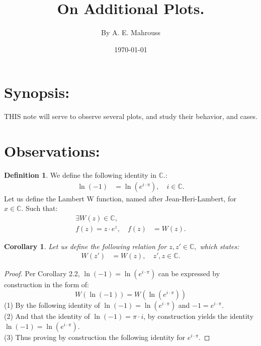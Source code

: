 \documentclass[10pt]{article}
\title{%
	\vspace{-1.5em}%
	\large\textbf{On Additional Plots.}%
}
\author{By A. E. Mahrouss}
\date{\today}
\theoremstyle{plain}
\newtheorem{corollary}[theorem]{Corollary}
\theoremstyle{definition}
\newtheorem{definition}[theorem]{Definition}
\theoremstyle{remark}
\begin{document}

\maketitle
\tableofcontents
\newpage

\section{Synopsis:}

\lettrine[lines=1, lhang=0.1, loversize=0.2]{T}HIS note will serve to observe several plots, and study their behavior, and cases.

\section{Observations:}

\begin{definition}
	We define the following identity in $\mathbb{C}.$:
	\begin{align*}
		\ln(-1)&=\ln(e^{i \cdot \pi}), \quad i \in \mathbb{C}.
	\end{align*}
	Let us define the Lambert W function, named after Jean-Heri-Lambert, for $x \in \mathbb{C}.$ Such that:
	\begin{align*}
		\exists W(z) \in \mathbb{C},\\
		f(z) = z \cdot e^{z}, \quad f(z) &= W(z).
	\end{align*}
\end{definition}

\begin{corollary}
	Let us define the following relation for $z, z' \in \mathbb{C},$ which states:
	\begin{align*}
		W(z') &= W(z), \quad z', z \in \mathbb{C}.
	\end{align*}
\end{corollary}

\begin{proof}
	Per Corollary 2.2, $\ln(-1)=\ln(e^{i \cdot \pi})$ can be expressed by construction in the form of:
	\begin{equation}
		W(\ln(-1)) = W(\ln(e^{i \cdot \pi}))
	\end{equation}
	(1) By the following identity of $\ln(-1)=\ln(e^{i \cdot \pi})$ and $-1 = e^{i \cdot \pi}.$\\
	(2) And that the identity of $\ln(-1) = \pi \cdot i$, by construction yields the identity $\ln(-1) = \ln(e^{i \cdot \pi}).$\\
	(3) Thus proving by construction the following identity for $e^{i \cdot \pi}$.
\end{proof}
\end{document}
